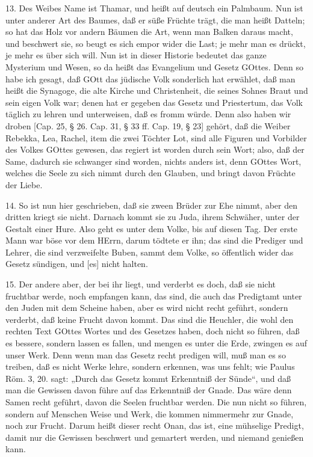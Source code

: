 13. Des Weibes Name ist Thamar, und heißt
auf deutsch ein Palmbaum. Nun ist unter anderer Art des Baumes, daß er süße Früchte trägt, die man heißt Datteln; so hat das Holz vor andern Bäumen die Art, wenn man Balken daraus macht, und beschwert sie, so beugt es sich empor wider die Last; je mehr man es drückt, je mehr es über sich will. Nun ist in dieser Historie bedeutet das ganze Mysterium und Wesen, so da heißt das Evangelium und Gesetz GOttes. Denn so habe ich gesagt, daß GOtt das jüdische Volk sonderlich hat erwählet, daß man heißt die Synagoge, die alte Kirche und Christenheit, die seines Sohnes Braut und sein eigen Volk war; denen hat er gegeben das Gesetz und Priestertum, das Volk täglich zu lehren und unterweisen, daß es fromm würde. Denn also haben wir droben [Cap. 25, § 26. Cap. 31, § 33 ff. Cap. 19, § 23] gehört, daß die Weiber Rebekka, Lea, Rachel, item die zwei Töchter Lot, sind alle Figuren und Vorbilder des Volkes GOttes gewesen, das regiert ist worden durch sein Wort; also, daß der Same, dadurch sie schwanger sind worden, nichts anders ist, denn GOttes Wort, welches die Seele zu sich nimmt durch den Glauben, und bringt davon Früchte der Liebe.

14. So ist nun hier geschrieben, daß sie zween Brüder zur Ehe nimmt, aber den dritten kriegt sie nicht. Darnach kommt sie zu Juda, ihrem Schwäher, unter der Gestalt einer Hure. Also geht es unter dem Volke, bis auf diesen Tag. Der erste Mann war böse vor dem HErrn, darum tödtete er ihn; das sind die Prediger und Lehrer, die sind verzweifelte Buben, sammt dem Volke, so öffentlich wider das Gesetz sündigen, und [es] nicht halten.

15. Der andere aber, der bei ihr liegt, und verderbt es doch, daß sie nicht fruchtbar werde, noch empfangen kann, das sind, die auch das Predigtamt unter den Juden mit dem Scheine haben, aber es wird nicht recht geführt, sondern verderbt, daß keine Frucht davon kommt. Das sind die Heuchler, die wohl den rechten Text GOttes Wortes und des Gesetzes haben, doch nicht so führen, daß es bessere, sondern lassen es fallen, und mengen es unter die Erde, zwingen es auf unser Werk. Denn wenn man das Gesetz recht predigen will, muß man es so treiben, daß es nicht Werke lehre, sondern erkennen, was uns fehlt; wie Paulus Röm. 3, 20. sagt: „Durch das Gesetz kommt Erkenntniß der Sünde“, und daß man die Gewissen davon führe auf das Erkenntniß der Gnade. Das wäre denn Samen recht geführt, davon die Seelen fruchtbar werden. Die nun nicht so führen, sondern auf Menschen Weise und Werk, die kommen nimmermehr zur Gnade, noch zur Frucht. Darum heißt dieser recht Onan, das ist, eine mühselige Predigt, damit nur die Gewissen beschwert und gemartert werden, und niemand genießen kann.

